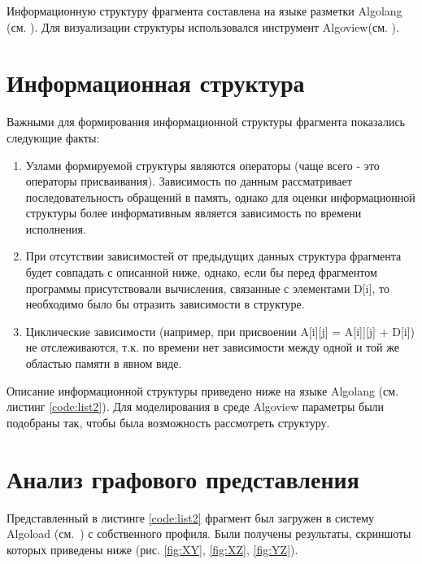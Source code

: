 \documentclass[12pt, fleqn]{article}
\theoremstyle{definition}
\begin{document}
Информационную структуру фрагмента составлена на языке разметки Algolang (см. \cite{algolang}). Для визуализации структуры использовался инструмент Algoview(см. \cite{algoview}). 
\section{Информационная структура}
Важными для формирования информационной структуры фрагмента показались следующие факты:
\begin{enumerate}
 \item Узлами формируемой структуры являются операторы (чаще всего - это операторы присваивания). Зависимость по данным рассматривает последовательность обращений в память, однако для оценки информационной структуры более информативным является зависимость по времени исполнения.
 \item При отсутствии зависимостей от предыдущих данных структура фрагмента будет совпадать с описанной ниже, однако, если бы перед фрагментом программы присутствовали вычисления, связанные с элементами D[i], то необходимо было бы отразить зависимости в структуре.
 \item Циклические зависимости (например, при присвоении A[i][j] = A[i]][j] + D[i]) не отслеживаются, т.к. по времени нет зависимости между одной и той же областью памяти в явном виде.
\end{enumerate}


Описание информационной структуры приведено ниже на языке Algolang (см. листинг \ref{code:list2}). Для моделирования в среде Algoview параметры были подобраны так, чтобы была возможность рассмотреть структуру.
{}

\section{Анализ графового представления}
Представленный в листинге \ref{code:list2} фрагмент был загружен в систему Algoload (см.~\cite{algoload}) с собственного профиля. Были получены результаты, скриншоты которых приведены ниже (рис. \ref{fig:XY}, \ref{fig:XZ}, \ref{fig:YZ}).
\end{document}
